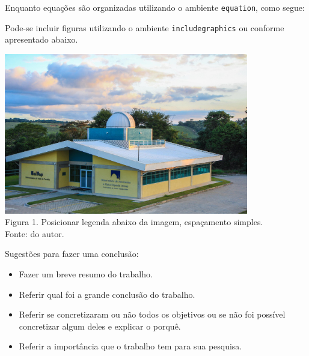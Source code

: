 \documentclass[a0paper,portrait]{baposter}
\begin{document}
\begin{poster}
{Enquanto equações são organizadas utilizando o ambiente \texttt{equation}, como segue:
}

{Pode-se incluir figuras utilizando o ambiente \texttt{includegraphics} ou conforme apresentado abaixo.

\begin{center}
\includegraphics[width=0.8\textwidth]{figures/observatorio.jpg}\\
Figura 1. Posicionar legenda abaixo da imagem, espaçamento simples.\\
Fonte: do autor.
\end{center}

\vspace{1.3cm}
\vspace{9cm}

}

{Sugestões para fazer uma conclusão:
\begin{itemize}
    \item Fazer um breve resumo do trabalho.
    \item Referir qual foi a grande conclusão do trabalho.
    \item Referir se concretizaram ou não todos os objetivos ou se não foi possível concretizar algum deles e explicar o porquê.
    \item Referir a importância que o trabalho tem para sua pesquisa. 
\end{itemize}

}
\end{poster}
\end{document}
